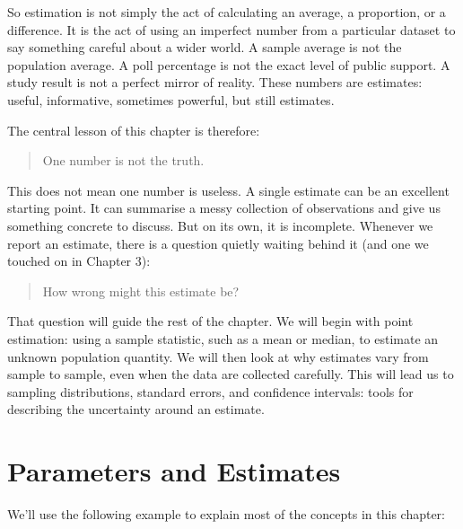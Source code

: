 \documentclass[
  letterpaper,
  DIV=11,
  numbers=noendperiod]{scrreprt}
\begin{document}
So estimation is not simply the act of calculating an average, a
proportion, or a difference. It is the act of using an imperfect number
from a particular dataset to say something careful about a wider world.
A sample average is not the population average. A poll percentage is not
the exact level of public support. A study result is not a perfect
mirror of reality. These numbers are estimates: useful, informative,
sometimes powerful, but still estimates.

The central lesson of this chapter is therefore:

\begin{quote}
One number is not the truth.
\end{quote}

This does not mean one number is useless. A single estimate can be an
excellent starting point. It can summarise a messy collection of
observations and give us something concrete to discuss. But on its own,
it is incomplete. Whenever we report an estimate, there is a question
quietly waiting behind it (and one we touched on in Chapter 3):

\begin{quote}
How wrong might this estimate be?
\end{quote}

That question will guide the rest of the chapter. We will begin with
point estimation: using a sample statistic, such as a mean or median, to
estimate an unknown population quantity. We will then look at why
estimates vary from sample to sample, even when the data are collected
carefully. This will lead us to sampling distributions, standard errors,
and confidence intervals: tools for describing the uncertainty around an
estimate.

\section{Parameters and Estimates}\label{parameters-and-estimates}

We'll use the following example to explain most of the concepts in this
chapter:
\end{document}
